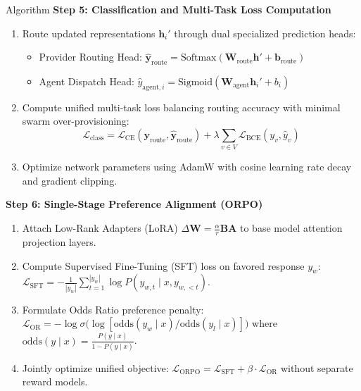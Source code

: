 \documentclass[aspectratio=169,10pt]{beamer}
\begin{document}
\begin{frame}[t]{Algorithm}
  \vspace{0.15em}
  {\large\bfseries\color{lavenderDark}Step 5: Classification and Multi-Task Loss Computation}
  \vspace{0.15em}
  \begin{enumerate}\setlength{\itemsep}{1.2pt}\small
    \item Route updated representations $\mathbf{h}_i'$ through dual specialized prediction heads:
      \begin{itemize}\setlength{\itemsep}{1pt}
        \item Provider Routing Head: $\hat{\mathbf{y}}_{\text{route}} = \mathrm{Softmax}(\mathbf{W}_{\text{route}} \mathbf{h}' + \mathbf{b}_{\text{route}})$
        \item Agent Dispatch Head: $\hat{y}_{\text{agent}, i} = \mathrm{Sigmoid}(\mathbf{W}_{\text{agent}} \mathbf{h}_i' + b_i)$
      \end{itemize}
    \item Compute unified multi-task loss balancing routing accuracy with minimal swarm over-provisioning:
      $$\mathcal{L}_{\text{class}} = \mathcal{L}_{\text{CE}}(\mathbf{y}_{\text{route}}, \hat{\mathbf{y}}_{\text{route}}) + \lambda \sum_{v \in V} \mathcal{L}_{\text{BCE}}(y_v, \hat{y}_v)$$
      \vspace{-0.3em}
    \item Optimize network parameters using AdamW with cosine learning rate decay and gradient clipping.
  \end{enumerate}
  \vspace{0.3em}
  {\large\bfseries\color{lavenderDark}Step 6: Single-Stage Preference Alignment (ORPO)}
  \vspace{0.15em}
  \begin{enumerate}\setlength{\itemsep}{1.2pt}\small
    \item Attach Low-Rank Adapters (LoRA) $\Delta \mathbf{W} = \frac{\alpha}{r} \mathbf{B}\mathbf{A}$ to base model attention projection layers.
    \item Compute Supervised Fine-Tuning (SFT) loss on favored response $y_w$: $\mathcal{L}_{\mathrm{SFT}} = -\frac{1}{|y_w|} \sum_{t=1}^{|y_w|} \log P(y_{w,t} \mid x, y_{w,<t})$.
    \item Formulate Odds Ratio preference penalty: $\mathcal{L}_{\mathrm{OR}} = -\log \sigma \big(\log [\mathrm{odds}(y_w \mid x) / \mathrm{odds}(y_l \mid x)]\big)$ where $\mathrm{odds}(y \mid x) = \frac{P(y \mid x)}{1 - P(y \mid x)}$.
    \item Jointly optimize unified objective: $\mathcal{L}_{\mathrm{ORPO}} = \mathcal{L}_{\mathrm{SFT}} + \beta \cdot \mathcal{L}_{\mathrm{OR}}$ without separate reward models.
  \end{enumerate}
\end{frame}
\end{document}
